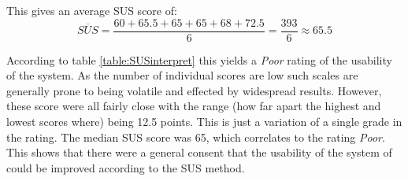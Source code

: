 This gives an average SUS score of: 
\[\overline{SUS} = \frac{60 + 65.5 + 65 + 65 + 68 + 72.5}{6} = \frac{393}{6} \approx 65.5\]

According to table \ref{table:SUSinterpret} this yields a \textit{Poor} rating of the usability of the system. As the number of individual scores are low such scales are generally prone to being volatile and effected by widespread results. However, these score were all fairly close with the range (how far apart the highest and lowest scores where) being 12.5 points. This is just a variation of a single grade in the rating. The median SUS score was 65, which correlates to the rating \textit{Poor}. This shows that there were a general consent that the usability of the system of could be improved according to the SUS method. 


\cleardoublepage
